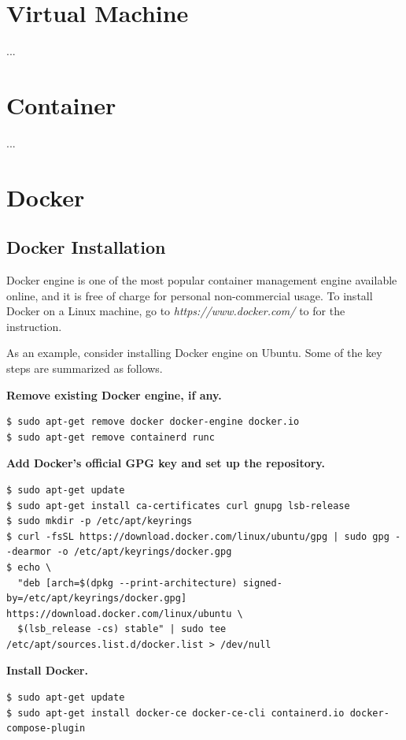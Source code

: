 \section{Virtual Machine}
...
\section{Container}
...
\section{Docker}

\subsection{Docker Installation}

Docker engine is one of the most popular container management engine available online, and it is free of charge for personal non-commercial usage. To install Docker on a Linux machine, go to \textit{https://www.docker.com/} to for the instruction. 

As an example, consider installing Docker engine on Ubuntu. Some of the key steps are summarized as follows.

\vspace{0.1in}
\noindent \textbf{Remove existing Docker engine, if any.}
\begin{lstlisting}
$ sudo apt-get remove docker docker-engine docker.io
$ sudo apt-get remove containerd runc
\end{lstlisting}

\vspace{0.1in}
\noindent \textbf{Add Docker's official GPG key and set up the repository.}
\begin{lstlisting}
$ sudo apt-get update
$ sudo apt-get install ca-certificates curl gnupg lsb-release
$ sudo mkdir -p /etc/apt/keyrings
$ curl -fsSL https://download.docker.com/linux/ubuntu/gpg | sudo gpg --dearmor -o /etc/apt/keyrings/docker.gpg
$ echo \
  "deb [arch=$(dpkg --print-architecture) signed-by=/etc/apt/keyrings/docker.gpg] https://download.docker.com/linux/ubuntu \
  $(lsb_release -cs) stable" | sudo tee /etc/apt/sources.list.d/docker.list > /dev/null
\end{lstlisting}

\vspace{0.1in}
\noindent \textbf{Install Docker.}
\begin{lstlisting}
$ sudo apt-get update
$ sudo apt-get install docker-ce docker-ce-cli containerd.io docker-compose-plugin
\end{lstlisting}

